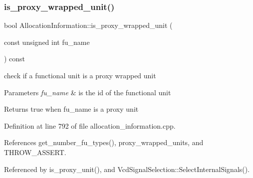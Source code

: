 \subsubsection{\texorpdfstring{is\+\_\+proxy\+\_\+wrapped\+\_\+unit()}{is\_proxy\_wrapped\_unit()}}
{\footnotesize\ttfamily bool Allocation\+Information\+::is\+\_\+proxy\+\_\+wrapped\+\_\+unit (\begin{DoxyParamCaption}\item[{const unsigned int}]{fu\+\_\+name }\end{DoxyParamCaption}) const}



check if a functional unit is a proxy wrapped unit 


\begin{DoxyParams}{Parameters}
{\em fu\+\_\+name} & is the id of the functional unit \\
\hline
\end{DoxyParams}
\begin{DoxyReturn}{Returns}
true when fu\+\_\+name is a proxy unit 
\end{DoxyReturn}


Definition at line 792 of file allocation\+\_\+information.\+cpp.



References get\+\_\+number\+\_\+fu\+\_\+types(), proxy\+\_\+wrapped\+\_\+units, and T\+H\+R\+O\+W\+\_\+\+A\+S\+S\+E\+RT.



Referenced by is\+\_\+proxy\+\_\+unit(), and Vcd\+Signal\+Selection\+::\+Select\+Internal\+Signals().

